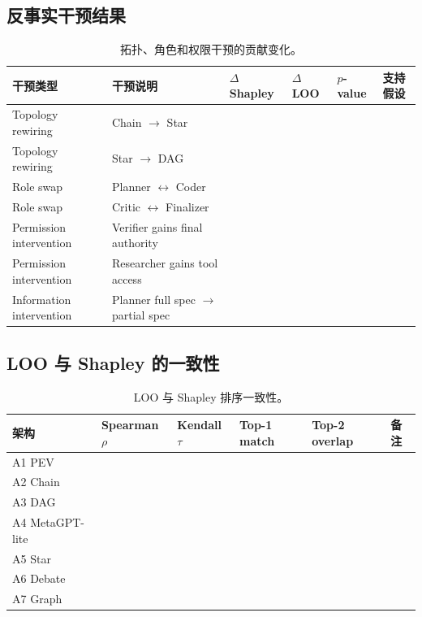 \documentclass[UTF8,a4paper,11pt]{ctexart}
\begin{document}
\subsection{反事实干预结果}

\begin{table}[H]
\centering
\caption{拓扑、角色和权限干预的贡献变化。}
\label{tab:interventions}
\begin{tabularx}{\textwidth}{L{0.20\textwidth}L{0.22\textwidth}C{0.13\textwidth}C{0.13\textwidth}C{0.13\textwidth}Y}
\toprule
干预类型 & 干预说明 & $\Delta$ Shapley & $\Delta$ LOO & $p$-value & 支持假设 \\
\midrule
Topology rewiring & Chain $\rightarrow$ Star &  &  &  &  \\
Topology rewiring & Star $\rightarrow$ DAG &  &  &  &  \\
Role swap & Planner $\leftrightarrow$ Coder &  &  &  &  \\
Role swap & Critic $\leftrightarrow$ Finalizer &  &  &  &  \\
Permission intervention & Verifier gains final authority &  &  &  &  \\
Permission intervention & Researcher gains tool access &  &  &  &  \\
Information intervention & Planner full spec $\rightarrow$ partial spec &  &  &  &  \\
\bottomrule
\end{tabularx}
\end{table}

\subsection{LOO 与 Shapley 的一致性}

\begin{table}[H]
\centering
\caption{LOO 与 Shapley 排序一致性。}
\label{tab:loo-shapley}
\begin{tabularx}{\textwidth}{L{0.18\textwidth}C{0.14\textwidth}C{0.14\textwidth}C{0.14\textwidth}C{0.14\textwidth}Y}
\toprule
架构 & Spearman $\rho$ & Kendall $\tau$ & Top-1 match & Top-2 overlap & 备注 \\
\midrule
A1 PEV &  &  &  &  &  \\
A2 Chain &  &  &  &  &  \\
A3 DAG &  &  &  &  &  \\
A4 MetaGPT-lite &  &  &  &  &  \\
A5 Star &  &  &  &  &  \\
A6 Debate &  &  &  &  &  \\
A7 Graph &  &  &  &  &  \\
\bottomrule
\end{tabularx}
\end{table}
\end{document}

